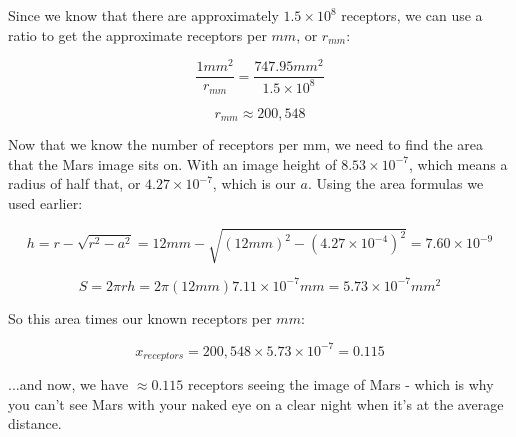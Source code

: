 \documentclass{article}
\begin{document}
\noindent Since we know that there are approximately $1.5\times10^8$ receptors, we can use a ratio to get the approximate receptors per $mm$, or $r_{mm}$:

\begin{equation}
    \frac{1mm^2}{r_{mm}} = \frac{747.95mm^2}{1.5\times 10^8}
\end{equation}

\begin{equation}
    r_{mm} \approx 200,548
\end{equation}

\noindent Now that we know the number of receptors per mm, we need to find the area that the Mars image sits on. With an image height of $8.53\times10^{-7}$, which means a radius of half that, or $4.27\times10^{-7}$, which is our $a$. Using the area formulas we used earlier:

\begin{equation}
    h = r - \sqrt{r^2 - a^2} = 12mm - \sqrt{(12mm)^2 - (4.27\times10^{-4})^2} = 7.60\times10^{-9}
\end{equation}

\begin{equation}
    S = 2 \pi r h = 2 \pi (12mm) {7.11\times10^{-7}mm} = 5.73\times10^{-7} mm^2
\end{equation}

\noindent So this area times our known receptors per $mm$:

\begin{equation}
    x_{receptors} = 200,548 \times 5.73\times10^{-7} = 0.115
\end{equation}

\noindent ...and now, we have $\approx 0.115$ receptors seeing the image of Mars - which is why you can't see Mars with your naked eye on a clear night when it's at the average distance.
\end{document}
